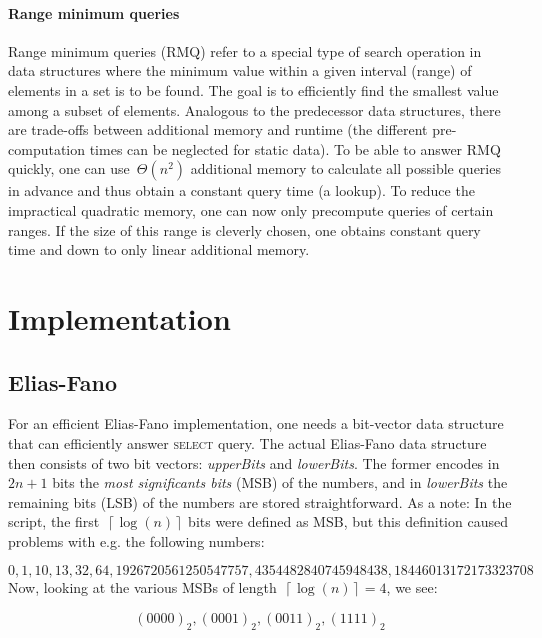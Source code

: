 \documentclass[a4paper,UKenglish,cleveref, autoref, thm-restate]{lipics-v2021}
\begin{document}
	\paragraph*{Range minimum queries}
	Range minimum queries (RMQ) refer to a special type of search operation in data structures where the minimum value within a given interval (range) of elements in a set is to be found. The goal is to efficiently find the smallest value among a subset of elements. Analogous to the predecessor data structures, there are trade-offs between additional memory and runtime (the different pre-computation times can be neglected for static data). To be able to answer RMQ quickly, one can use~$\Theta\left(n^2\right)$ additional memory to calculate all possible queries in advance and thus obtain a constant query time (a lookup). To reduce the impractical quadratic memory, one can now only precompute queries of certain ranges. If the size of this range is cleverly chosen, one obtains constant query time and down to only linear additional memory.
	
	\section{Implementation}
	
	\subsection{Elias-Fano}
	For an efficient Elias-Fano implementation, one needs a bit-vector data structure that can efficiently answer \textsc{select} query. The actual Elias-Fano data structure then consists of two bit vectors: \textit{upperBits} and \textit{lowerBits}. The former encodes in~$2n+1$ bits the \textit{most significants bits} (MSB) of the numbers, and in \textit{lowerBits} the remaining bits (LSB) of the numbers are stored straightforward. As a note: In the script, the first~$\left\lceil \log\left(n\right)\right\rceil$ bits were defined as MSB, but this definition caused problems with e.g. the following numbers:
	
	\begin{equation*}
		0, 1, 10, 13, 32, 64, 1926720561250547757, 4354482840745948438, 18446013172173323708
	\end{equation*}
	Now, looking at the various MSBs of length~$\left\lceil \log\left(n\right)\right\rceil = 4$, we see:
	
	\begin{equation}
		\left(0000\right)_2, \left(0001\right)_2, \left(0011\right)_2, \left(1111\right)_2
	\end{equation}
	
\end{document}
